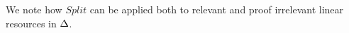 \documentclass[acmsmall,review,anonymous]{acmart}
\newcommand{\ccase}[2]{\mathsf{case}~#1~\mathsf{of}~#2}
\begin{document}
%
We note how $Split$ can be applied both to relevant and proof irrelevant linear resources in $\Delta$.


\end{document}
